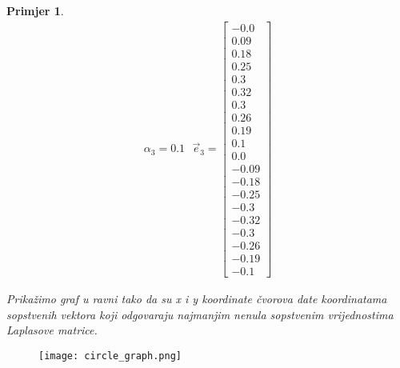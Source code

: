 \documentclass[11pt]{article}
\newtheorem{example}{Primjer}
\begin{document}
\begin{example}
\[\begin{split}
				\alpha_3=0.1  \text{  } \vec{e}_3 = \begin{bmatrix} -0.0 \\ 0.09 \\ 0.18 \\ 0.25 \\ 0.3 \\ 0.32 \\ 0.3 \\ 0.26 \\ 0.19 \\ 0.1 \\ 0.0 \\ -0.09 \\ -0.18 \\ -0.25 \\ -0.3 \\ -0.32 \\ -0.3 \\ -0.26 \\ -0.19 \\ -0.1 \end{bmatrix}
			\end{split}
		\]
			
		Prikažimo graf u ravni tako da su x i y koordinate čvorova date koordinatama sopstvenih vektora koji odgovaraju najmanjim nenula sopstvenim vrijednostima Laplasove matrice.
			
		\end{example}
		
		\begin{figure}[h]
			\centering
			\texttt{[image: circle\_graph.png]}
		\end{figure}
            
\end{document}
